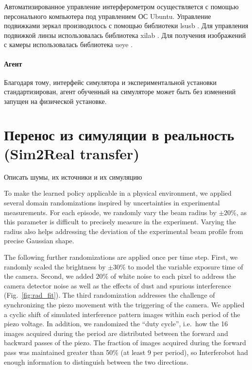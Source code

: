 Автоматизированное управление интерферометром осуществляется с помощью персонального компьютера под управлением ОС Ubuntu. Управление подвижками зеркал производилось с помощью библиотеки lsusb \cite{lsusb}. Для управления подвижкой линзы использовалась библиотека xilab \cite{standa_soft}. Для получения изображений с камеры использовалась библиотека ueye \cite{ids_soft}. 


\paragraph{Агент}

Благодаря тому, интерфейс симулятора и экспериментальной установки стандартизирован, агент обученный на симуляторе может быть без изменений запущен на физической установке. 


\section{Перенос из симуляции в реальность (Sim2Real transfer)}

Описать шумы, их источники и их симуляцию

To make the learned policy applicable in a physical environment, we applied several domain randomizations inspired by uncertainties in experimental measurements. 
For each episode, we randomly vary the beam radius by $\pm 20\%$, as this parameter is difficult to precisely measure in the experiment. Varying the radius also helps addressing the deviation of the experimental beam profile from precise Gaussian shape.

The following further randomizations are applied once per time step. First, we randomly scaled the brightness by $\pm 30\%$ to model the variable exposure time of the camera. Second, we added $20\%$ of white noise to each pixel to address the camera detector noise as well as the effects of dust and spurious interference  (Fig.~\ref{fig:rad_fit}). The third randomization addresses the challenge of synchronizing the piezo movement with the triggering of the camera. We applied a cyclic shift of simulated interference pattern images within each period of the piezo voltage. In addition, we randomized the ``duty cycle'', i.e.~how the 16 images acquired during the period are distributed between the forward and backward passes of the piezo. The fraction of images acquired during the forward pass was maintained greater than 50\% (at least 9 per period), so Interferobot had enough information to distinguish between the two directions.

